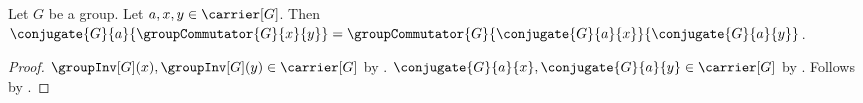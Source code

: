 \begin{theorem}\label{spike17_group_commutator_conjugate}
    Let $G$ be a group.
    Let $a,x,y\in\carrier[G]$.
    Then
        $\conjugate{G}{a}{\groupCommutator{G}{x}{y}}
            =\groupCommutator{G}
                {\conjugate{G}{a}{x}}{\conjugate{G}{a}{y}}$.
\end{theorem}
\begin{proof}
    $\groupInv[G](x),\groupInv[G](y)\in\carrier[G]$ by
        .
    $\conjugate{G}{a}{x},\conjugate{G}{a}{y}\in\carrier[G]$ by
        .
    Follows by
        .
\end{proof}
